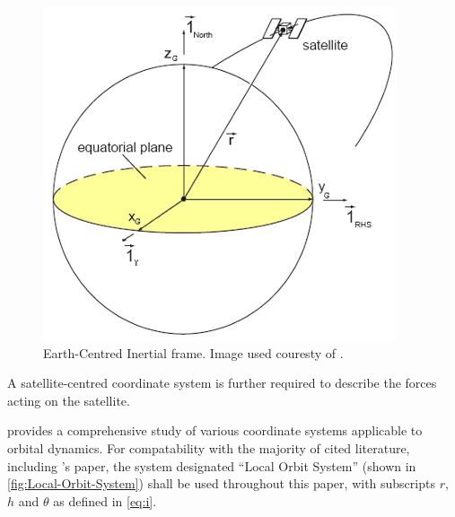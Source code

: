 \begin{figure}[h]
\begin{center}
\includegraphics[scale=0.75]{Images/ECI-frame.JPG}
\end{center}
\caption{Earth-Centred Inertial frame. Image used couresty of \textcite{Keppeler_thesis}.}
\label{fig:Earth-Centred-Inertial-frame}
\end{figure}

A satellite-centred coordinate system is further required to describe the forces acting on the satellite.
 
\textcite{Keppeler_thesis} provides a comprehensive study of various coordinate systems applicable to orbital dynamics. For compatability with the majority of cited literature, including \citeauthor{Keppeler_thesis}'s paper, the system designated \enquote{Local Orbit System} (shown in \autoref{fig:Local-Orbit-System}) shall be used throughout this paper, with subscripts $r$, $h$ and $\theta$ as defined in \autoref{eq:i}.
 
